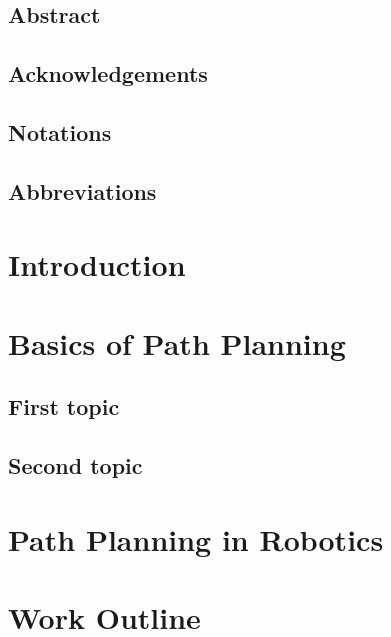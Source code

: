 \documentclass{thesisreport}
\begin{document}
  
 
  \section*{Abstract}
 
 \section*{Acknowledgements}
 
 
 
 \section*{Notations}
 

  \section*{Abbreviations}
 
 
 \listoffigures
 
\listoftables
 
 \tableofcontents
 
 
 \chapter*{Introduction}
 
 
 \chapter{Basics of Path Planning}
 
 \section{First topic}
 
 \section{Second topic}
 
 \chapter{Path Planning in Robotics} 
 
 \chapter{Work Outline}
  
\end{document}

